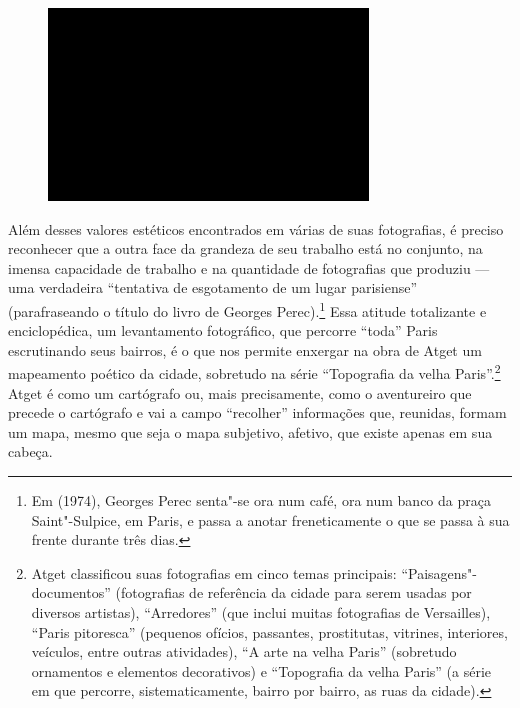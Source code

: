 \begin{figure}[!ht]

\centering
 \includegraphics[width=85mm]{./imgs/im1.jpg}
\caption{\tiny{}}

\end{figure}

Além desses valores estéticos encontrados em várias de suas fotografias,
é preciso reconhecer que a outra face da grandeza de seu trabalho está
no conjunto, na imensa capacidade de trabalho e na quantidade de
fotografias que produziu --- uma verdadeira ``tentativa de esgotamento de
um lugar parisiense'' (parafraseando o título do livro de Georges
Perec).\footnote{Em {} (1974), Georges Perec senta"-se ora num café, ora num
  banco da praça Saint"-Sulpice, em Paris, e passa a anotar
  freneticamente {} o que se passa à sua frente durante três
  dias.} Essa atitude totalizante e enciclopédica, um levantamento
fotográfico, que percorre ``toda'' Paris escrutinando seus bairros, é o
que nos permite enxergar na obra de Atget um mapeamento poético da
cidade, sobretudo na série ``Topografia da velha Paris''.\footnote{Atget
  classificou suas fotografias em cinco temas principais:
  ``Paisagens"-documentos'' (fotografias de referência da cidade para
  serem usadas por diversos artistas), ``Arredores'' (que inclui muitas
  fotografias de Versailles), ``Paris pitoresca'' (pequenos ofícios,
  passantes, prostitutas, vitrines, interiores, veículos, entre outras
  atividades), ``A arte na velha Paris'' (sobretudo ornamentos e
  elementos decorativos) e ``Topografia da velha Paris'' (a série em que
  percorre, sistematicamente, bairro por bairro, as ruas da cidade).}
Atget é como um cartógrafo ou, mais precisamente, como o aventureiro que
precede o cartógrafo e vai a campo ``recolher'' informações que,
reunidas, formam um mapa, mesmo que seja o mapa subjetivo, afetivo, que
existe apenas em sua cabeça.

